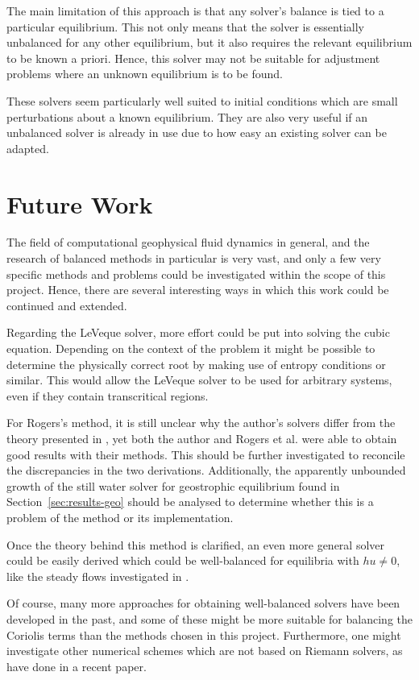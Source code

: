 The main limitation of this approach is that any solver's balance is tied to a particular equilibrium. This not only means that the solver is essentially unbalanced for any other equilibrium, but it also requires the relevant equilibrium to be known a priori. Hence, this solver may not be suitable for adjustment problems where an unknown equilibrium is to be found.

These solvers seem particularly well suited to initial conditions which are small perturbations about a known equilibrium. They are also very useful if an unbalanced solver is already in use due to how easy an existing solver can be adapted.

\section{Future Work}

The field of computational geophysical fluid dynamics in general, and the research of balanced methods in particular is very vast, and only a few very specific methods and problems could be investigated within the scope of this project. Hence, there are several interesting ways in which this work could be continued and extended.

Regarding the LeVeque solver, more effort could be put into solving the cubic equation. Depending on the context of the problem it might be possible to determine the physically correct root by making use of entropy conditions or similar. This would allow the LeVeque solver to be used for arbitrary systems, even if they contain transcritical regions.

For Rogers's method, it is still unclear why the author's solvers differ from the theory presented in \citet{rogers2003mathematical}, yet both the author and Rogers et al. were able to obtain good results with their methods. This should be further investigated to reconcile the discrepancies in the two derivations. Additionally, the apparently unbounded growth of the still water solver for geostrophic equilibrium found in Section~\ref{sec:results-geo} should be analysed to determine whether this is a problem of the method or its implementation.

Once the theory behind this method is clarified, an even more general solver could be easily derived which could be well-balanced for equilibria with $hu \neq 0$, like the steady flows investigated in \citet{esler2005steady}.

Of course, many more approaches for obtaining well-balanced solvers have been developed in the past, and some of these might be more suitable for balancing the Coriolis terms than the methods chosen in this project. Furthermore, one might investigate other numerical schemes which are not based on Riemann solvers, as \citet{chertockwell} have done in a recent paper.

